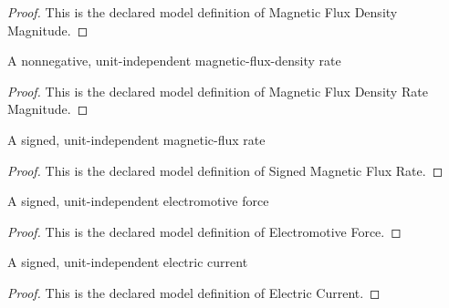\begin{proof}
  This is the declared model definition of Magnetic Flux Density Magnitude.
\end{proof}
\begin{definition}
  \label{def:physics:phyx-mini-0917:phyxminiproblems-problemphyxmini0917-magneticfluxdensityratemagnitude}
  A nonnegative, unit-independent magnetic-flux-density rate
\end{definition}
\begin{proof}
  This is the declared model definition of Magnetic Flux Density Rate Magnitude.
\end{proof}
\begin{definition}
  \label{def:physics:phyx-mini-0917:phyxminiproblems-problemphyxmini0917-signedmagneticfluxrate}
  A signed, unit-independent magnetic-flux rate
\end{definition}
\begin{proof}
  This is the declared model definition of Signed Magnetic Flux Rate.
\end{proof}
\begin{definition}
  \label{def:physics:phyx-mini-0917:phyxminiproblems-problemphyxmini0917-electromotiveforce}
  A signed, unit-independent electromotive force
\end{definition}
\begin{proof}
  This is the declared model definition of Electromotive Force.
\end{proof}
\begin{definition}
  \label{def:physics:phyx-mini-0917:phyxminiproblems-problemphyxmini0917-electriccurrent}
  A signed, unit-independent electric current
\end{definition}
\begin{proof}
  This is the declared model definition of Electric Current.
\end{proof}
